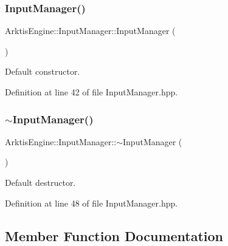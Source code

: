 \subsubsection{\texorpdfstring{InputManager()}{InputManager()}}
{\footnotesize\ttfamily Arktis\+Engine\+::\+Input\+Manager\+::\+Input\+Manager (\begin{DoxyParamCaption}{ }\end{DoxyParamCaption})\hspace{0.3cm}{\ttfamily [inline]}}



Default constructor. 

\begin{DoxyVerb}\end{DoxyVerb}
 

Definition at line 42 of file Input\+Manager.\+hpp.


\begin{DoxyCode}{0}

\end{DoxyCode}
\mbox{\label{class_arktis_engine_1_1_input_manager_a9e73e0af9adc36ae1d73483618dbc306}} 
\subsubsection{\texorpdfstring{$\sim$InputManager()}{~InputManager()}}
{\footnotesize\ttfamily Arktis\+Engine\+::\+Input\+Manager\+::$\sim$\+Input\+Manager (\begin{DoxyParamCaption}{ }\end{DoxyParamCaption})\hspace{0.3cm}{\ttfamily [inline]}}



Default destructor. 

\begin{DoxyVerb}\end{DoxyVerb}
 

Definition at line 48 of file Input\+Manager.\+hpp.


\begin{DoxyCode}{0}

\end{DoxyCode}


\subsection{Member Function Documentation}
\mbox{\label{class_arktis_engine_1_1_input_manager_ab5bdb467c356e8ca0a058a7b9162f869}} 
